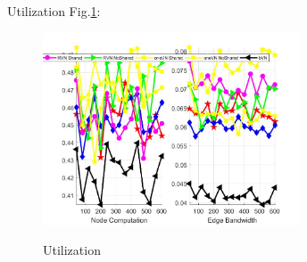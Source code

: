 Utilization Fig.\ref{fig:Utilization}:
\begin{figure}
  \centering
  \includegraphics[width=3in]{Fig/Utilization}\\
  \caption{Utilization}\label{fig:Utilization}
\end{figure}


